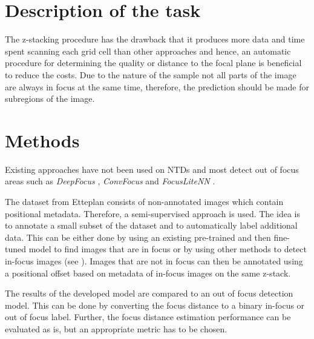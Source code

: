 \documentclass[a4paper,11pt]{article}
\begin{document}
\section{Description of the task}


The z-stacking procedure has the drawback that it produces more data and time spent scanning each grid cell than other approaches and hence, an automatic procedure for determining the quality or distance to the focal plane is beneficial to reduce the costs. Due to the nature of the sample not all parts of the image are always in focus at the same time, therefore, the prediction should be made for subregions of the image. 


\section{Methods}


Existing approaches have not been used on NTDs and most detect out of focus areas such as \emph{DeepFocus} \cite{senaras2018deepfocus}, \emph{ConvFocus} \cite{kohlberger2019wholeslide} and \emph{FocusLiteNN} \cite{wang2020focuslitenn}.

The dataset from Etteplan consists of non-annotated images which contain positional metadata. Therefore, a semi-supervised approach is used. The idea is to annotate a small subset of the dataset and to automatically label additional data. This can be either done by using an existing pre-trained and then fine-tuned model to find images that are in focus or by using other methods to detect in-focus images (see \citeauthor{yusun2005autofocusing} \cite{yusun2005autofocusing}). Images that are not in focus can then be annotated using a positional offset based on metadata of in-focus images on the same z-stack.

The results of the developed model are compared to an out of focus detection model. This can be done by converting the focus distance to a binary in-focus or out of focus label. Further, the focus distance estimation performance can be evaluated as is, but an appropriate metric has to be chosen.
\end{document}

